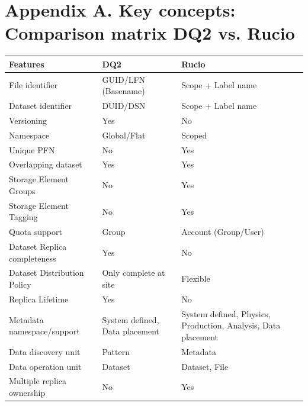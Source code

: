 \documentclass{atlasnote}
\begin{document}
\section*{Appendix A. Key concepts: Comparison matrix DQ2 vs. Rucio}
\label{Comparison_matrix::doc}\label{Comparison_matrix:key-concepts-comparison-matrix-dq2-vs-rucio}
\begin{tabular}{l l p{5cm} }
\toprule
\textbf{
Features
} & \textbf{
DQ2
} & \textbf{
Rucio
}\\
\midrule

File identifier
 & 
GUID/LFN (Basename)
 & 
Scope + Label name
\\

Dataset identifier
 & 
DUID/DSN
 & 
Scope + Label name
\\

Versioning
 & 
Yes
 & 
No
\\

Namespace
 & 
Global/Flat
 & 
Scoped
\\

Unique PFN
 & 
No
 & 
Yes
\\

Overlapping dataset
 & 
Yes
 & 
Yes
\\

Storage Element Groups
 & 
No
 & 
Yes
\\

Storage Element Tagging
 & 
No
 & 
Yes
\\

Quota support
 & 
Group
 & 
Account (Group/User)
\\

Dataset Replica completeness
 & 
Yes
 & 
No
\\

Dataset Distribution Policy
&
Only complete at site
&
Flexible
\\

Replica Lifetime
&
Yes
&
No
\\

Metadata namespace/support
 & 
System defined, Data placement
 & 
System defined, Physics, Production, Analysis, Data placement
\\

Data discovery unit
 & 
Pattern
 & 
Metadata
\\

Data operation unit
 & 
Dataset
 & 
Dataset, File
\\

Multiple replica ownership
 & 
No
 & 
Yes
\\


\end{tabular}
\end{document}
